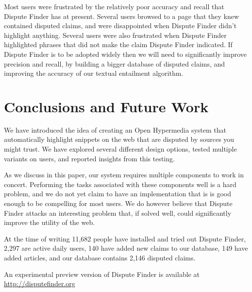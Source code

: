 \documentclass{www2010-submission}
\newcommand{\todo}[1]{}
\begin{document}
Most users were frustrated by the relatively poor accuracy and recall that Dispute Finder has at present. Several users browsed to a page that they knew contained disputed claims, and were disappointed when Dispute Finder didn't highlight anything. Several users were also frustrated when Dispute Finder highlighted phrases that did not make the claim Dispute Finder indicated. If Dispute Finder is to be adopted widely then we will need to significantly improve precision and recall, by building a bigger database of disputed claims, and improving the accuracy of our textual entailment algorithm.

\todo{Need to say that the argumentation graph contains all existing claims and that it was a simple ``supports"/``opposes'' graph.}

\todo{Come up with terminology for marking an evidence snippet, and agree on evidence vs source vs article}
\todo{Talk about how the early versions conflated evidence and snippets - and whether it makes sense to distinguish between them}
\todo{Screenshot of the claim graph interface}


\section{Conclusions and Future Work}

We have introduced the idea of creating an Open Hypermedia system that automatically highlight snippets on the web that are disputed by sources you might trust. We have explored several different design options, tested multiple variants on users, and reported insights from this testing.

As we discuss in this paper, our system requires multiple components to work in concert. Performing the tasks associated with these components well is a hard problem, and we do not yet claim to have an implementation that is is good enough to be compelling for most users. We do however believe that Dispute Finder attacks an interesting problem that, if solved well, could significantly improve the utility of the web.

At the time of writing 11,682 people have installed and tried out Dispute Finder, 2,297 are active daily users, 140 have added new claims to our database, 149 have added articles, and our database contains 2,146 disputed claims. 

An experimental preview version of Dispute Finder is available at 
\url{http://disputefinder.org}


\todo{Add count of disputed claims}


\todo{Do we want to have acknowledgements}


\todo{Sort out bad references}

\end{document}

